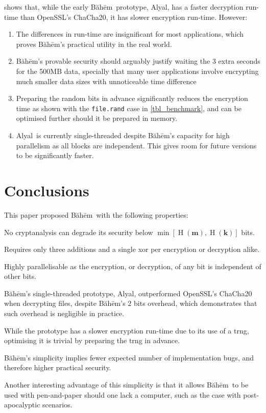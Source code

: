 \documentclass[twocolumn,hidelinks]{article}
\newcommand{\baheem}{Băhēm}
\newcommand{\alyal}{Alyal}
\DeclareMathOperator{\entropy}{H}
\begin{document}
 shows that, while the early \baheem\ prototype,
\alyal, has a faster decryption run-time than OpenSSL's ChaCha20, it has
slower encryption run-time. However:
\begin{enumerate}
    \item The differences in run-time are insignificant for most
        applications, which proves \baheem's practical utility in the real
        world.
    \item \baheem's provable security should arguably justify waiting the
        $3$ extra seconds for the 500MB data, specially that many user
        applications involve encrypting much smaller data sizes with
        unnoticeable time difference
    \item Preparing the random bits in advance significantly reduces the
        encryption time as shown with the \texttt{file.rand} case in
        \cref{tbl_benchmark}, and can be optimised further should it be
        prepared in memory.
    \item \alyal\ is currently single-threaded despite \baheem's capacity
        for high parallelism as all blocks are independent. This gives room
        for future versions to be significantly faster.
\end{enumerate}

\section{Conclusions}
This paper proposed \baheem\ with the following properties:
\begin{description}[itemsep=0em]
    \item[Secure.] No cryptanalysis can degrade its
        security below $\min[\entropy(\mathbf{m}), \entropy(\mathbf{k})]$
        bits.

    \item[Fast.] Requires only three additions and a single \gls{xor} per
        encryption or decryption alike.

        Highly parallelisable as the encryption, or decryption, of any bit
        is independent of other bits.

        \baheem's single-threaded prototype, \alyal, outperformed OpenSSL's
        ChaCha20 when decrypting files, despite \baheem's $2$ bits
        overhead, which demonstrates that such overhead is negligible in
        practice.

        While the prototype has a slower encryption run-time due to its use
        of a \gls{trng}, optimising it is trivial by preparing the
        \gls{trng} in advance.

    \item[Simple.] \baheem's simplicity implies fewer expected number of
        implementation bugs, and therefore higher practical security.

        Another interesting advantage of this simplicity is that it allows
        \baheem\ to be used with pen-and-paper should one lack a computer,
        such as the case with post-apocalyptic scenarios.
\end{description}



\end{document}
